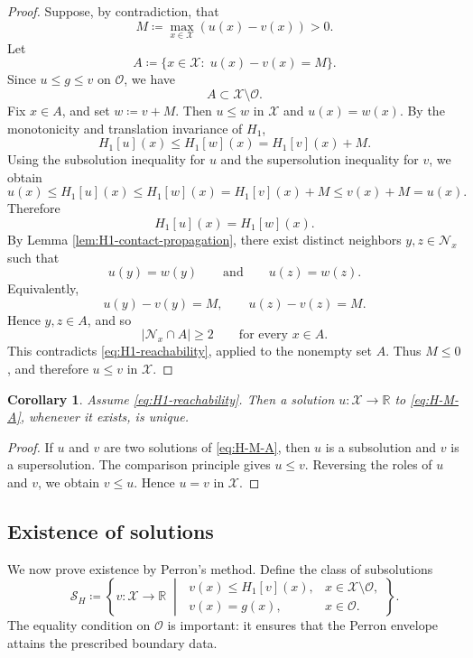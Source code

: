 \documentclass[reqno,11pt]{amsart}
\numberwithin{equation}{section}
\newtheorem{corollary}[theorem]{Corollary}
\theoremstyle{definition}
\theoremstyle{remark}
\begin{document}
\begin{proof}
Suppose, by contradiction, that
\[
    M\coloneqq \max_{x\in\mathcal X}(u(x)-v(x))>0.
\]
Let
\[
    A\coloneqq
    \{x\in\mathcal X \colon \; u(x)-v(x)=M\}.
\]
Since \(u\le g\le v\) on \(\mathcal O\), we have
\[
    A\subset \mathcal X\setminus\mathcal O.
\]
Fix \(x\in A\), and set \(w\coloneqq v+M\). Then \(u\le w\) in \(\mathcal X\) and \(u(x)=w(x)\). By the monotonicity and translation invariance of \(H_1\),
\[
    H_1[u](x)\le H_1[w](x)=H_1[v](x)+M.
\]
Using the subsolution inequality for \(u\) and the supersolution inequality for \(v\), we obtain
\[
    u(x)
    \le
    H_1[u](x)
    \le
    H_1[w](x)
    =
    H_1[v](x)+M
    \le
    v(x)+M
    =
    u(x).
\]
Therefore
\[
    H_1[u](x)=H_1[w](x).
\]
By Lemma \ref{lem:H1-contact-propagation}, there exist distinct neighbors \(y,z\in\mathcal N_x\) such that
\[
    u(y)=w(y)
    \qquad\text{and}\qquad
    u(z)=w(z).
\]
Equivalently,
\[
    u(y)-v(y)=M,
    \qquad
    u(z)-v(z)=M.
\]
Hence \(y,z\in A\), and so
\[
    |\mathcal N_x\cap A|\ge 2
    \qquad\text{for every }x\in A.
\]
This contradicts \eqref{eq:H1-reachability}, applied to the nonempty set \(A\). Thus \(M\le0\), and therefore \(u\le v\) in \(\mathcal X\).
\end{proof}

\begin{corollary}\label{cor:homo-uniqueness}
Assume \eqref{eq:H1-reachability}. Then a solution
\(u\colon\mathcal X\to\mathbb R\) to \eqref{eq:H-M-A}, whenever it exists, is unique.
\end{corollary}

\begin{proof}
If \(u\) and \(v\) are two solutions of \eqref{eq:H-M-A}, then \(u\) is a subsolution and \(v\) is a supersolution. The comparison principle gives \(u\le v\). Reversing the roles of \(u\) and \(v\), we obtain \(v\le u\). Hence \(u=v\) in \(\mathcal X\).
\end{proof}

\subsection{Existence of solutions}

We now prove existence by Perron's method. Define the class of subsolutions
\[
\mathcal S_H
\coloneqq
\left\{
v\colon\mathcal X\to\mathbb R
\;\middle|\;
\begin{array}{ll}
v(x)\le H_1[v](x),
& x\in\mathcal X\setminus\mathcal O,\\[0.8ex]
v(x)=g(x),
& x\in\mathcal O.
\end{array}
\right\}.
\]
The equality condition on \(\mathcal O\) is important: it ensures that the Perron envelope attains the prescribed boundary data.
\end{document}
